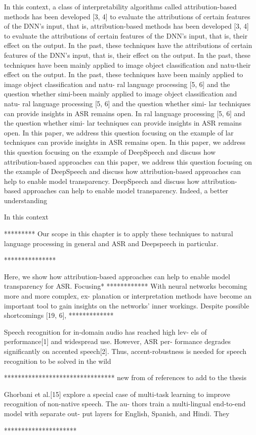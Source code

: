 In this context, a class of interpretability algorithms called attribution-based methods has been developed [3, 4] to evaluate the attributions of certain features of the DNN’s input, that is,
attribution-based methods has been developed [3, 4] to evaluate the attributions of certain features of the DNN’s input, that is, their effect on the output. In the past, these techniques have
the attributions of certain features of the DNN’s input, that is, their effect on the output. In the past, these techniques have been mainly applied to image object classification and natu-their effect on the output. In the past, these techniques have been mainly applied to image object classification and natu- ral language processing [5, 6] and the question whether simi-been mainly applied to image object classification and natu- ral language processing [5, 6] and the question whether simi- lar techniques can provide insights in ASR remains open. In
ral language processing [5, 6] and the question whether simi- lar techniques can provide insights in ASR remains open. In this paper, we address this question focusing on the example of
lar techniques can provide insights in ASR remains open. In this paper, we address this question focusing on the example of DeepSpeech and discuss how attribution-based approaches can
this paper, we address this question focusing on the example of DeepSpeech and discuss how attribution-based approaches can help to enable model transparency.
DeepSpeech and discuss how attribution-based approaches can help to enable model transparency. Indeed, a better understanding


In this context


*********
 Our scope in this chapter is to apply these techniques to natural language processing in general and ASR and Deepspeech in particular.
 
***************

Here, we show how attribution-based approaches can help
to enable model transparency for ASR. Focusing*
************
With neural networks becoming more and more complex, ex- planation or interpretation methods have become an important tool to gain insights on the networks’ inner workings. Despite possible shortcomings [19, 6], 
*************


Speech recognition for in-domain audio has reached high lev- els of performance[1] and widespread use. However, ASR per- formance degrades significantly on accented speech[2]. Thus, accent-robustness is needed for speech recognition to be solved in the wild






********************************
 new from of references to add to the thesis

Ghorbani et al.[15] explore a special case of multi-task
learning to improve recognition of non-native speech. The au- thors train a multi-lingual end-to-end model with separate out- put layers for English, Spanish, and Hindi. They


*********************